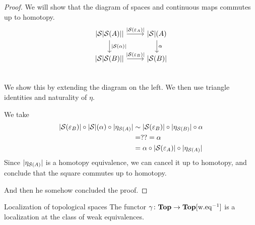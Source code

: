 \documentclass[language=english]{TemplateLecture}
\begin{document}
\begin{proof}
    We will show that the diagram of spaces and continuous maps commutes up to homotopy.
    \[\begin{tikzcd}
        \abs{\cS\abs{\cS(A)}} \ar[r, "\abs{\cS(\varepsilon_A)}"]\ar[d, "\abs{\cS(\alpha)}"] & \abs \cS(A) \ar[d, "\alpha"] \\
        \abs{\cS\abs{\cS(B)}} \ar[r, "\abs{\cS(\varepsilon_B)}"] & \abs{\cS(B)} \\
    \end{tikzcd}\]
    We show this by extending the diagram on the left. We then use triangle identities and naturality of \(\eta\).

    We take
    \[\begin{split}
        \lvert\mathcal{S}(\varepsilon_B)\rvert\circ \lvert\mathcal{S}\rvert(\alpha) \circ \lvert\eta_{\mathcal{S}(A)}\rvert &\sim \lvert\mathcal{S}(\varepsilon_B)\rvert \circ \lvert\eta_{\mathcal{S}(B)}\rvert \circ \alpha \\
        &= ?? = \alpha \\
        &= \alpha\circ \lvert\mathcal{S}(\varepsilon_A)\rvert \circ \lvert\eta_{\mathcal{S}(A)}\rvert
    \end{split}\]
    Since \(\lvert\eta_{\mathcal{S}(A)}\rvert\) is a homotopy equivalence, we can cancel it up to homotopy, and conclude that the square commutes up to homotopy.

    And then he somehow concluded the proof.
\end{proof}


\begin{thm}{Localization of topological spaces}{}
    The functor \(\gamma\colon \mathbf{Top} \to \mathbf{Top}[\mathrm{w.eq}^{-1}]\) is a localization at the class of weak equivalences.
\end{thm}
\end{document}
